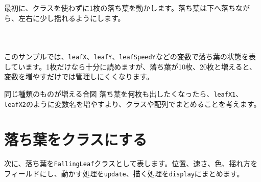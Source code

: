 最初に、クラスを使わずに1枚の落ち葉を動かします。落ち葉は下へ落ちながら、左右に少し揺れるようにします。

\begin{listing}[htbp]
\inputminted[firstline=1,lastline=26]{ts}{typescript-p5/listings/chapter19/single-leaf.ts}
\caption{1枚の落ち葉を動かすスケッチ（\texttt{chapter19/single-leaf.ts}）}
\label{lst:chapter19-single-leaf-sketch}
\end{listing}

\begin{listing}[htbp]
\inputminted[firstline=28,lastline=36]{ts}{typescript-p5/listings/chapter19/single-leaf.ts}
\caption{落ち葉の位置を更新する関数（\texttt{chapter19/single-leaf.ts}）}
\label{lst:chapter19-single-leaf-update}
\end{listing}

\begin{listing}[htbp]
\inputminted[firstline=38,lastline=55]{ts}{typescript-p5/listings/chapter19/single-leaf.ts}
\caption{落ち葉を揺らしながら描く関数（\texttt{chapter19/single-leaf.ts}）}
\label{lst:chapter19-single-leaf-display}
\end{listing}

このサンプルでは、\texttt{leafX}、\texttt{leafY}、\texttt{leafSpeedY}などの変数で落ち葉の状態を表しています。1枚だけなら十分に読めますが、落ち葉が10枚、20枚と増えると、変数を増やすだけでは管理しにくくなります。

\begin{pointbox}{同じ種類のものが増える合図}
落ち葉を何枚も出したくなったら、\texttt{leafX1}、\texttt{leafX2}のように変数名を増やすより、クラスや配列でまとめることを考えます。
\end{pointbox}

\section{落ち葉をクラスにする}

次に、落ち葉を\texttt{FallingLeaf}クラスとして表します。位置、速さ、色、揺れ方をフィールドにし、動かす処理を\texttt{update}、描く処理を\texttt{display}にまとめます。

\begin{listing}[htbp]
\inputminted[firstline=1,lastline=30]{ts}{typescript-p5/listings/chapter19/leaf-class.ts}
\caption{\texttt{FallingLeaf}クラスのフィールドとコンストラクタ（\texttt{chapter19/leaf-class.ts}）}
\label{lst:chapter19-leaf-class-constructor}
\end{listing}

